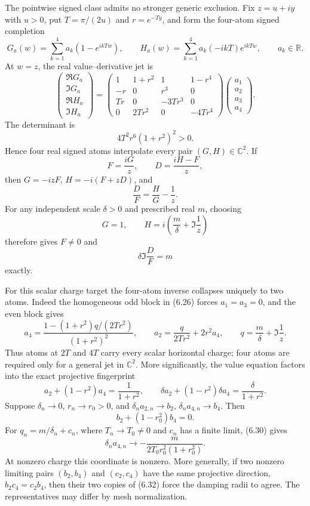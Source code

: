 \documentclass[11pt]{article}
\theoremstyle{definition}
\theoremstyle{remark}
\newcommand{\C}{\mathbb C}
\newcommand{\R}{\mathbb R}
\begin{document}
The pointwise signed class admits no stronger generic exclusion.  Fix $z=u+iy$ with $u>0$, put
$T=\pi/(2u)$ and $r=e^{-Ty}$, and form the four-atom signed completion
\[
 G_a(w)=\sum_{k=1}^4a_k(1-e^{ikTw}),\qquad
 H_a(w)=\sum_{k=1}^4a_k(-ikT)e^{ikTw},
 \qquad a_k\in\R.                                      \tag{6.25}
\]
At $w=z$, the real value--derivative jet is
\[
\begin{pmatrix}
\Re G_a\\ \Im G_a\\ \Re H_a\\ \Im H_a
\end{pmatrix}
=
\begin{pmatrix}
1&1+r^2&1&1-r^4\\
-r&0&r^3&0\\
Tr&0&-3Tr^3&0\\
0&2Tr^2&0&-4Tr^4
\end{pmatrix}
\begin{pmatrix}a_1\\a_2\\a_3\\a_4\end{pmatrix}.         \tag{6.26}
\]
The determinant is
\[
 4T^2r^6(1+r^2)^2>0.                                   \tag{6.27}
\]
Hence four real signed atoms interpolate every pair $(G,H)\in\C^2$.  If
\[
 F=\frac{iG}{z},\qquad D=\frac{iH-F}{z},
\]
then $G=-izF$, $H=-i(F+zD)$, and
\[
 \frac DF=\frac HG-\frac1z.                            \tag{6.28}
\]
For any independent scale $\delta>0$ and prescribed real $m$, choosing
\[
 G=1,\qquad H=i\left(\frac m\delta+\Im\frac1z\right)
\]
therefore gives $F\ne0$ and
\[
 \delta\Im\frac DF=m                                   \tag{6.29}
\]
exactly.

For this scalar charge target the four-atom inverse collapses uniquely to two atoms.  Indeed the
homogeneous odd block in (6.26) forces $a_1=a_3=0$, and the even block gives
\[
 a_4=\frac{1-(1+r^2)q/(2Tr^2)}{(1+r^2)^2},
 \qquad
 a_2=\frac{q}{2Tr^2}+2r^2a_4,
 \qquad q=\frac m\delta+\Im\frac1z .                   \tag{6.30}
\]
Thus atoms at $2T$ and $4T$ carry every scalar horizontal charge; four atoms are required only
for a general jet in $\C^2$.  More significantly, the value equation factors into the exact
projective fingerprint
\[
 a_2+(1-r^2)a_4=\frac1{1+r^2},\qquad
 \delta a_2+(1-r^2)\delta a_4=\frac{\delta}{1+r^2}.
                                                               \tag{6.31}
\]
Suppose $\delta_n\to0$, $r_n\to r_0>0$, and
$\delta_na_{2,n}\to b_2$, $\delta_na_{4,n}\to b_4$.  Then
\[
 b_2+(1-r_0^2)b_4=0.                                  \tag{6.32}
\]
For $q_n=m/\delta_n+c_n$, where $T_n\to T_0\ne0$ and $c_n$ has a finite
limit, (6.30) gives
\[
 \delta_na_{4,n}\longrightarrow
 -\frac{m}{2T_0r_0^2(1+r_0^2)}.                       \tag{6.33}
\]
At nonzero charge this coordinate is nonzero.  More generally, if two nonzero limiting pairs
$(b_2,b_4)$ and $(c_2,c_4)$ have the same projective direction,
$b_2c_4=c_2b_4$, then their two copies of (6.32) force the damping radii to agree.  The
representatives may differ by mesh normalization.
\end{document}
